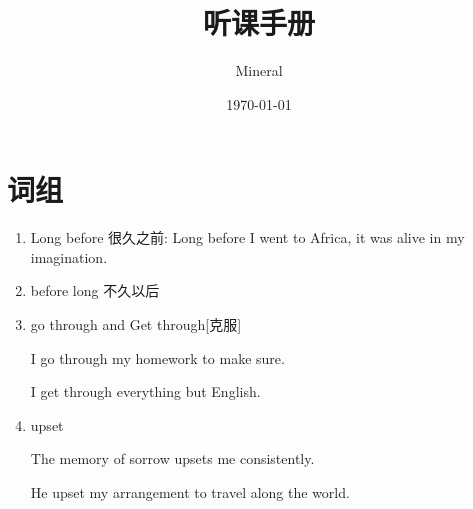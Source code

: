 \documentclass[utf8]{ctexart}
\author{Mineral}
\title{听课手册}
\date {\today}
\begin{document}
		\maketitle
		\section{词组}
		\begin{enumerate}
				\item Long before 很久之前: Long before I went to Africa, it was alive in my imagination.
				\item before long 不久以后	
				\item go through and Get through[克服]
					\par I go through my homework to make sure.
					\par I get through everything but English.	
			\item upset
					\par The memory of sorrow upsets me consistently.
					\par He upset my arrangement to travel along the world.	
					 

\end{enumerate}
\end{document}
